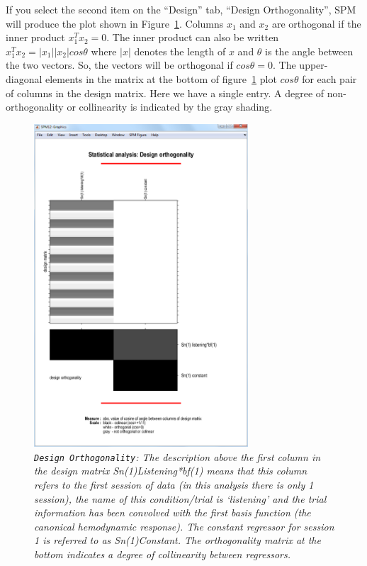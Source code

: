 If you select the second item on the ``Design'' tab, ``Design Orthogonality'', SPM will produce the plot shown in Figure~\ref{aud_orth}. Columns $x_1$ and $x_2$ are orthogonal if the inner product $x_1^T x_2=0$. The inner product can also be written $x_1^T x_2 = |x_1||x_2| cos \theta$ where $|x|$ denotes the length of $x$ and $\theta$ is the angle between the two vectors. So, the vectors will be orthogonal if $cos \theta=0$. The upper-diagonal elements in the matrix at the bottom of figure~\ref{aud_orth} plot $cos\theta$ for each pair of columns in the design matrix. Here we have a single entry.  A degree of non-orthogonality or collinearity is indicated by the gray shading.

\begin{figure}
\begin{center}
\includegraphics[width=80mm]{auditory/aud_orth}
\caption{\emph{\texttt{Design Orthogonality}: The description above the first column in the design matrix {\sf Sn(1)Listening*bf(1)} means that this column refers to the first session of data (in this analysis there is only 1 session), the name of this condition/trial is `listening' and the trial information has been convolved with the first basis function (the canonical hemodynamic response). The constant regressor for session 1 is referred to as {\sf Sn(1)Constant}. The orthogonality matrix at the bottom indicates a degree of collinearity between regressors. \label{aud_orth}}}
\end{center}
\end{figure}

